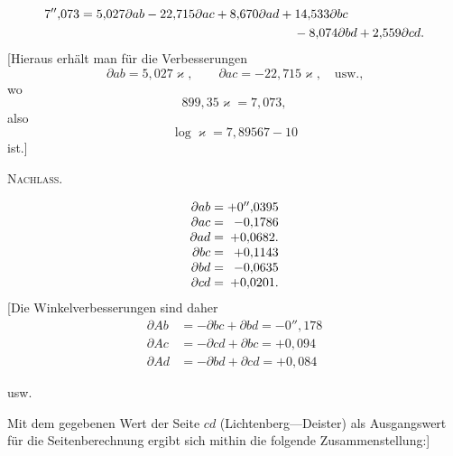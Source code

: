 \[
\begin{aligned}
7''{,}073={}&5{,}027\partial ab-22{,}715\partial ac+8{,}670\partial ad+14{,}533\partial bc\\
&\hspace{5.5cm}-8{,}074\partial bd+2{,}559\partial cd.
\end{aligned}
\]
[Hieraus erhält man für die Verbesserungen
\[
\partial ab=5{,}027\varkappa,\qquad\partial ac=-22{,}715\varkappa,\quad\text{usw.,}
\]
\noindent wo
\[
899{,}35\varkappa=7{,}073,
\]
\noindent also
\[
\log\varkappa=7{,}89567-10
\]
\noindent ist.]

\clearpage
{}\hfill\textsc{Nachlass.}\hfill\mbox{}\par\medskip
\[
\begin{array}{r@{\;}c@{\;}r}
\partial ab&=&+0''{,}0395\\
\partial ac&=&-0{,}1786\\
\partial ad&=&+0{,}0682.\\
\partial bc&=&+0{,}1143\\
\partial bd&=&-0{,}0635\\
\partial cd&=&+0{,}0201.
\end{array}
\]
[Die Winkelverbesserungen sind daher
\[
\begin{aligned}
\partial Ab&=-\partial bc+\partial bd=-0''{,}178\\
\partial Ac&=-\partial cd+\partial bc=+0{,}094\\
\partial Ad&=-\partial bd+\partial cd=+0{,}084
\end{aligned}
\]
\begin{center}usw.\end{center}
Mit dem gegebenen Wert der Seite $cd$ (Lichtenberg---Deister) als Ausgangswert für die Seitenberechnung ergibt sich mithin die folgende Zusammenstellung:]
